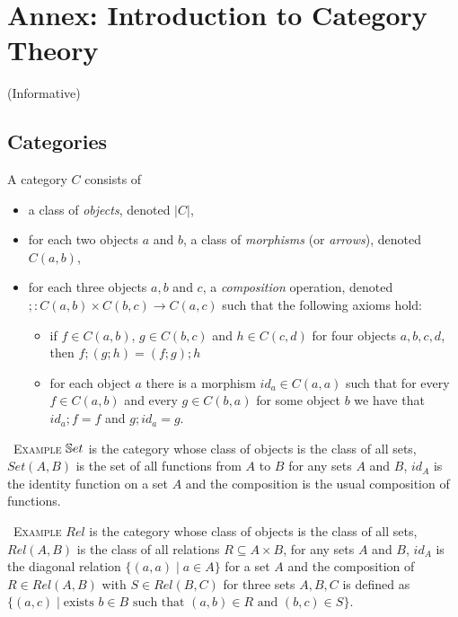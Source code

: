 \documentclass[10pt,fleqn,final]{scrreprt}
\newcommand{\informative}[0]{{\begin{center}{\Large{(Informative})}\end{center}} \bigskip}
\newcommand{\infannex}[1]{ \chapter{Annex: #1}  \informative }
\newenvironment{example}[0]{\ \newline \textsc{Example}\quad }{}
\begin{document}
\infannex{Introduction to Category Theory}\label{a:categories}

\section{Categories}

\begin{definition}
A category $C$ consists of 
 \begin{itemize}
   \item a class of \emph{objects}, denoted $|C|$,
   \item for each two objects $a$ and $b$, a class of \emph{morphisms} (or \emph{arrows}), denoted $C(a,b)$,
   \item for each three objects $a, b$ and $c$, a \emph{composition} operation,
   denoted $; : C(a,b) \times C(b,c) \to C(a,c)$ such that the following axioms hold:
    \begin{itemize}
      \item if $f\in C(a,b)$, $g\in C(b,c)$ and $h\in C(c,d)$ for four objects
            $a,b,c,d$, then $f;(g;h) = (f;g);h$ 
      \item for each object $a$ there is a morphism $id_a\in C(a,a)$ such that 
            for every $f \in C(a,b)$ and every $g \in C(b,a)$ for some object $b$ we 
            have that $id_a;f = f$ and $g;id_a = g$.
    \end{itemize}
 \end{itemize} 
\end{definition}

\begin{example}
 $\mathbb{S}et$ is the category whose class of objects is the class of all sets, 
 $Set(A,B)$ is the set of all functions from $A$ to $B$ for any sets $A$ and $B$,
 $id_A$ is the identity function on a set $A$ and the composition 
 is the usual composition of functions.
\end{example}

\begin{example}
 $Rel$ is the category whose class of objects is the class of all sets,
 $Rel(A,B)$ is the class of all relations $R \subseteq A \times B$, for any sets
 $A$ and $B$, $id_A$ is the diagonal relation $\{(a,a) \mid a \in A\}$ for a set $A$ 
 and the composition of $R\in Rel(A,B)$ with $S\in Rel(B,C)$ for three sets
 $A,B,C$ is defined as $\{(a,c) \mid \text{exists } b \in B \text{ such that } 
 (a,b)\in R \text{ and } (b,c)\in S\}$.
\end{example}
\end{document}
